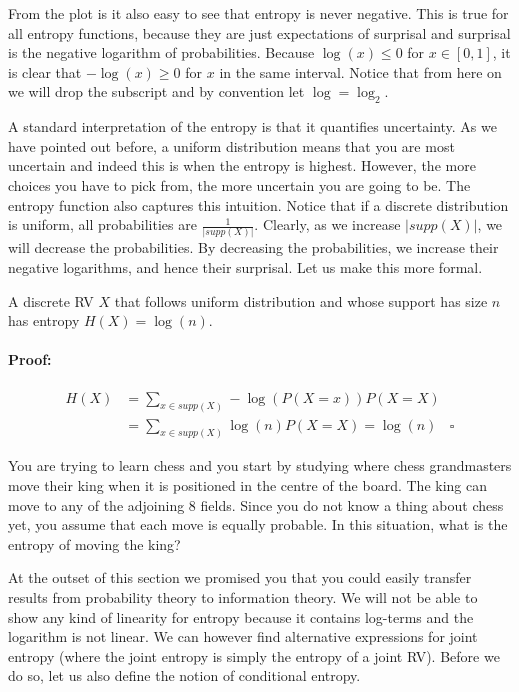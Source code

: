 From the plot is it also easy to see that entropy is never negative. This is true for all entropy functions,
because they are just expectations of surprisal and surprisal is the negative logarithm of probabilities. 
Because $ \log(x) \leq 0 $ for $ x \in [0,1] $, it is clear that $ -\log(x) \geq 0 $ for $ x $ in the same
interval. Notice that from here on we will drop the subscript and by convention let $ \log = \log_{2} $.

A standard interpretation of the entropy is that it quantifies uncertainty. As we have pointed out
before, a uniform distribution means that you are most uncertain and indeed this is when the entropy
is highest. However, the more choices you have to pick from, the more uncertain you are going to be. 
The entropy function also captures this intuition. Notice that if a discrete distribution is uniform,
all probabilities are $ \frac{1}{|supp(X)|} $. Clearly, as we increase $ |supp(X)| $, we will decrease the
probabilities. By decreasing the probabilities, we increase their negative logarithms, and hence their
surprisal. Let us make this more formal.

\begin{Theorem}
A discrete RV $ X $ that follows uniform distribution and whose support has size $ n $ has entropy
$ H(X) = \log(n) $.
\end{Theorem}

\paragraph{Proof:}
\begin{align}
H(X) &= \underset{x \in supp(X)}{\sum}-\log(P(X=x))P(X=X) \\
&= \underset{x \in supp(X)}{\sum}\log(n)P(X=X) = \log(n)~~~~\square
\end{align}

\begin{Exercise}
You are trying to learn chess and you start by studying where chess grandmasters move their king when it
is positioned in the centre of the board. The king can move to any of the adjoining 8 fields. Since
you do not know a thing about chess yet, you assume that each move is equally probable. In this situation,
what is the entropy of moving the king?
\end{Exercise}

At the outset of this section we promised you that you could easily transfer results from probability 
theory to information theory. We will not be able to show any kind of linearity for entropy because it contains
log-terms and the logarithm is not linear. We can however find alternative expressions for joint entropy (where 
the joint entropy is simply the entropy of a joint RV). Before we do so, let us also define the notion of 
conditional entropy.

